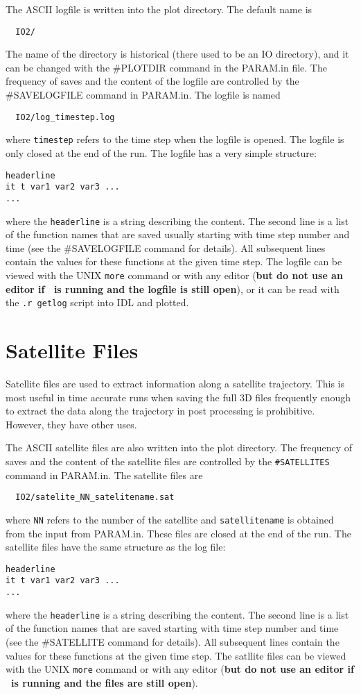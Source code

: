 The ASCII logfile is written into the plot directory. The default name is
\begin{verbatim}
  IO2/
\end{verbatim}
The name of the directory is historical (there used to be an IO directory),
and it can be changed with the \#PLOTDIR command in the PARAM.in file.
The frequency of saves and the content of the logfile are controlled by
the \#SAVELOGFILE command in PARAM.in. The logfile is named 
\begin{verbatim}
  IO2/log_timestep.log
\end{verbatim}
where {\tt timestep} refers to the time step when the logfile
is opened. The logfile is only closed at the end of the run.
The logfile has a very simple structure:
\begin{verbatim}
headerline
it t var1 var2 var3 ...
...
\end{verbatim}
where the {\tt headerline} is a string describing the content.
The second line is a list of the function names that are saved usually
starting with time step number and time 
(see the \#SAVELOGFILE command for details). 
All subsequent lines contain the values for these functions
at the given time step. The logfile can be viewed with the 
UNIX {\tt more} command or with any editor ({\bf but do not use an
editor if \BATSRUS\ is running and the logfile is still open}), 
or it can be read with the {\tt .r getlog} script into IDL and plotted.

\section{Satellite Files \label{section:satellitefiles}}

Satellite files  are used to extract information along a satellite
trajectory.  This is most useful in time accurate runs when 
saving the full 3D files frequently enough to extract the data along
the trajectory in post processing is prohibitive.  However, they
have other uses.

The ASCII satellite files are also written into the plot directory.
The frequency of saves and the content of the satellite files 
are controlled by the {\tt \#SATELLITES} command in PARAM.in. 
The satellite files are
\begin{verbatim}
  IO2/satelite_NN_satelitename.sat
\end{verbatim}
where {\tt NN} refers to the number of the satellite and 
{\tt satellitename} is obtained from the input from PARAM.in.
These files are closed at the end of the run.
The satellite files have the same structure as the log file:
\begin{verbatim}
headerline
it t var1 var2 var3 ...
...
\end{verbatim}
where the {\tt headerline} is a string describing the content.
The second line is a list of the function names that are saved
starting with time step number and time 
(see the \#SATELLITE command for details).
All subsequent lines contain the values for these functions
at the given time step. The satllite files can be viewed with the 
UNIX {\tt more} command or with any editor ({\bf but do not use an
editor if \BATSRUS\ is running and the files are  still open}). 

